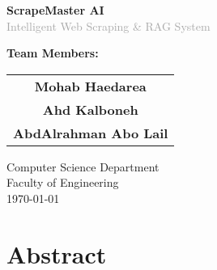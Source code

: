 \documentclass[12pt,a4paper]{report}
\begin{document}
\begin{titlepage}
    \centering
    \vspace*{2cm}
    
    
    \vspace{1cm}
    
    {\huge\bfseries\textcolor{primaryblue}{ScrapeMaster AI}}\\[0.5cm]
    {\Large\textcolor{darkgray}{Intelligent Web Scraping \& RAG System}}\\[1cm]
    
    
    \vspace{2cm}
    
    {\Large\textbf{Team Members:}}\\[0.5cm]
    \begin{tabular}{c}
        \textcolor{primaryblue}{\textbf{Mohab Haedarea}} \\[0.3cm]
        \textcolor{primaryblue}{\textbf{Ahd Kalboneh}} \\[0.3cm]
        \textcolor{primaryblue}{\textbf{AbdAlrahman Abo Lail}} \\
    \end{tabular}
    
    \vfill
    
    {\large Computer Science Department}\\
    {\large Faculty of Engineering}\\
    {\large \today}
    
\end{titlepage}

\tableofcontents
\newpage

\chapter*{Abstract}
\end{document}
